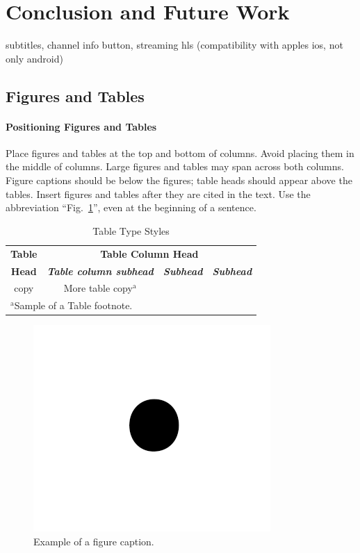 \documentclass[conference]{IEEEtran}
\begin{document}
\section{Conclusion and Future Work}

subtitles, channel info button, streaming hls (compatibility with apples ios, not only android)



\subsection{Figures and Tables}
\paragraph{Positioning Figures and Tables} Place figures and tables at the top and 
bottom of columns. Avoid placing them in the middle of columns. Large 
figures and tables may span across both columns. Figure captions should be 
below the figures; table heads should appear above the tables. Insert 
figures and tables after they are cited in the text. Use the abbreviation 
``Fig.~\ref{fig}'', even at the beginning of a sentence.

\begin{table}[htbp]
\caption{Table Type Styles}
\begin{center}
\begin{tabular}{|c|c|c|c|}
\hline
\textbf{Table}&\multicolumn{3}{|c|}{\textbf{Table Column Head}} \\
\cline{2-4} 
\textbf{Head} & \textbf{\textit{Table column subhead}}& \textbf{\textit{Subhead}}& \textbf{\textit{Subhead}} \\
\hline
copy& More table copy$^{\mathrm{a}}$& &  \\
\hline
\multicolumn{4}{l}{$^{\mathrm{a}}$Sample of a Table footnote.}
\end{tabular}
\label{tab1}
\end{center}
\end{table}

\begin{figure}[htbp]
\centerline{\includegraphics{fig1.png}}
\caption{Example of a figure caption.}
\label{fig}
\end{figure}
\end{document}

